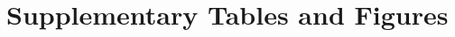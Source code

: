 \documentclass[utf8]{frontiers_suppmat} %
\begin{document}
\onecolumn
{}

\title[Supplementary Material]{{}}


\maketitle


%
%

\section{Supplementary Tables and Figures}
\end{document}
